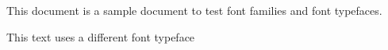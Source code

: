 \documentclass{article}
\begin{document}
	This document is a sample document to test font 
	families and font typefaces.
	
	This text uses a different font typeface
\end{document}

